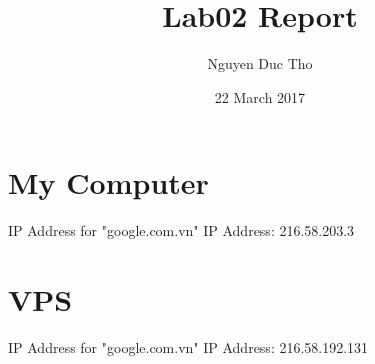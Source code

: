 \documentclass{article}
\title{Lab02 Report}
\author{Nguyen Duc Tho}
\date{22 March 2017}
\begin{document}
\maketitle




\section{My Computer}
IP Address for "google.com.vn"
IP Address: 216.58.203.3
\section{VPS}
IP Address for "google.com.vn"
IP Address: 216.58.192.131
\end{document}
